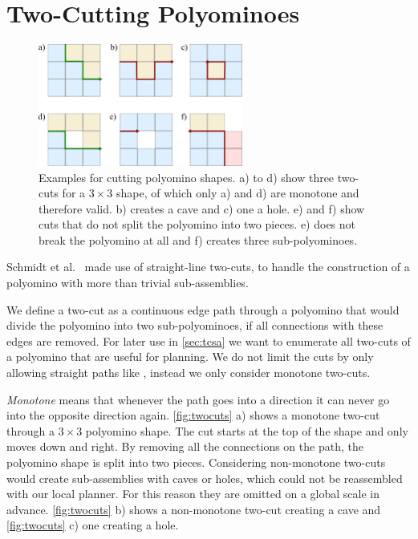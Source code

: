 \section{Two-Cutting Polyominoes}
\label{sec:twocutting}

\begin{figure}
	\centering
	\includegraphics[width=0.6\textwidth]{figures/twocuts.pdf}
	\caption[Different cuts for polyomino shapes]{Examples for cutting polyomino shapes. a) to d) show three two-cuts for a $3\times3$ shape, of which only a) and d) are monotone and therefore valid. b) creates a cave and c) one a hole. e) and f) show cuts that do not split the polyomino into two pieces. e) does not break the polyomino at all and f) creates three sub-polyominoes.}
	\label{fig:twocuts}
\end{figure}

Schmidt et al.\ \cite{Schmidt2018} made use of straight-line two-cuts, to handle the construction of a polyomino with more than trivial sub-assemblies.

We define a two-cut as a continuous edge path through a polyomino that would divide the polyomino into two sub-polyominoes, if all connections with these edges are removed.
For later use in \autoref{sec:tcsa} we want to enumerate all two-cuts of a polyomino that are useful for planning.
We do not limit the cuts by only allowing straight paths like \cite{Schmidt2018}, instead we only consider monotone two-cuts.

\textit{Monotone} means that whenever the path goes into a direction it can never go into the opposite direction again.
\autoref{fig:twocuts} a) shows a monotone two-cut through a $3\times3$ polyomino shape.
The cut starts at the top of the shape and only moves down and right.
By removing all the connections on the path, the polyomino shape is split into two pieces.
Considering non-monotone two-cuts would create sub-assemblies with caves or holes, which could not be reassembled with our local planner.
For this reason they are omitted on a global scale in advance.
\autoref{fig:twocuts} b) shows a non-monotone two-cut creating a cave and \autoref{fig:twocuts} c) one creating a hole.

